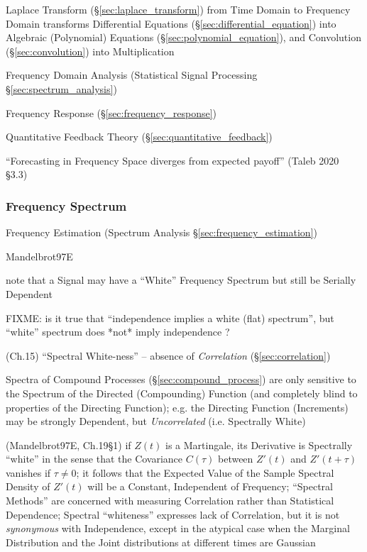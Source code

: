 Laplace Transform (\S\ref{sec:laplace_transform}) from Time Domain to Frequency
Domain transforms Differential Equations (\S\ref{sec:differential_equation})
into Algebraic (Polynomial) Equations (\S\ref{sec:polynomial_equation}), and
Convolution (\S\ref{sec:convolution}) into Multiplication

\fist Frequency Domain Analysis (Statistical Signal Processing
\S\ref{sec:spectrum_analysis})

\fist Frequency Response (\S\ref{sec:frequency_response})

\fist Quantitative Feedback Theory (\S\ref{sec:quantitative_feedback})

``Forecasting in Frequency Space diverges from expected payoff''
(Taleb 2020 \S 3.3)



\subsubsection{Frequency Spectrum}\label{sec:frequency_spectrum}

\fist Frequency Estimation (Spectrum Analysis \S\ref{sec:frequency_estimation})

Mandelbrot97E

note that a Signal may have a ``White'' Frequency Spectrum but still be Serially
Dependent

FIXME: is it true that ``independence implies a white (flat) spectrum'',
but ``white'' spectrum does *not* imply independence ?

(Ch.15) ``Spectral White-ness'' -- absence of \emph{Correlation}
(\S\ref{sec:correlation})

Spectra of Compound Processes (\S\ref{sec:compound_process}) are only sensitive
to the Spectrum of the Directed (Compounding) Function (and completely blind to
properties of the Directing Function); e.g. the Directing Function (Increments)
may be strongly Dependent, but \emph{Uncorrelated} (i.e. Spectrally White)

(Mandelbrot97E, Ch.19\S 1) if $Z(t)$ is a Martingale, its Derivative is
Spectrally ``white'' in the sense that the Covariance $C(\tau)$ between $Z'(t)$
and $Z'(t + \tau)$ vanishes if $\tau \neq 0$; it follows that the Expected Value
of the Sample Spectral Density of $Z'(t)$ will be a Constant, Independent of
Frequency; ``Spectral Methods'' are concerned with measuring Correlation rather
than Statistical Dependence; Spectral ``whiteness'' expresses lack of
Correlation, but it is not \emph{synonymous} with Independence, except in the
atypical case when the Marginal Distribution and the Joint distributions at
different times are Gaussian

